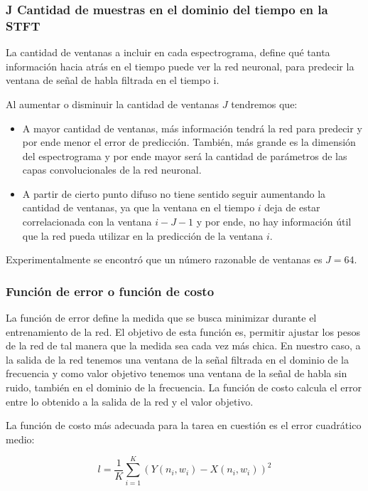 \subsubsection{J Cantidad de muestras en el dominio del tiempo en la STFT}
\label{sec:ventanas_en_espectrogramas}

La cantidad de ventanas a incluir en cada espectrograma, define qué tanta información hacia atrás en el tiempo puede ver la red neuronal, para predecir la ventana de señal de habla filtrada en el tiempo i. 

Al aumentar o disminuir la cantidad de ventanas $J$ tendremos que:

\begin{itemize}
	\item A mayor cantidad de ventanas, más información tendrá la red para predecir y por ende menor el error de predicción. También, más grande es la dimensión del espectrograma y por ende mayor será la cantidad de parámetros de las capas convolucionales de la red neuronal.
	\item A partir de cierto punto difuso no tiene sentido seguir aumentando la cantidad de ventanas, ya que la ventana en el tiempo $i$ deja de estar correlacionada con la ventana $i - J - 1$ y por ende, no hay información útil que la red pueda utilizar en la predicción de la ventana $i$.
\end{itemize}

Experimentalmente se encontró que un número razonable de ventanas es $J=64$.

\subsubsection{Función de error o función de costo}

La función de error define la medida que se busca minimizar durante el entrenamiento de la red. El objetivo de esta función es, permitir ajustar los pesos de la red de tal manera que la medida sea cada vez más chica. En nuestro caso, a la salida de la red tenemos una ventana de la señal filtrada en el dominio de la frecuencia y como valor objetivo tenemos una ventana de la señal de habla sin ruido, también en el dominio de la frecuencia. La función de costo calcula el error entre lo obtenido a la salida de la red y el valor objetivo. 

La función de costo más adecuada para la tarea en cuestión es el error cuadrático medio:

\begin{equation*}
	l = \frac{1}{K} \sum_{i=1}^K (Y(n_i, w_i) - X(n_i, w_i))^2
\end{equation*}

